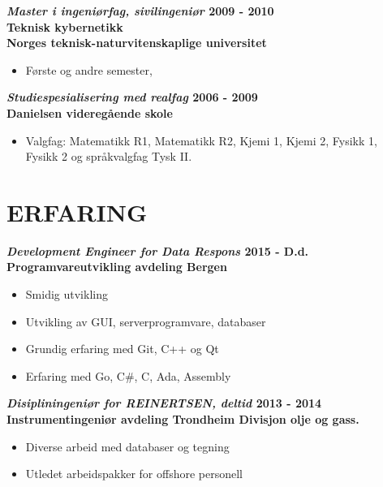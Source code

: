 \documentclass[margin, 10pt, norsk]{res} %
\begin{document}
\begin{resume}
\textbf{\emph{Master i ingeniørfag, sivilingeniør} \hfill 2009 - 2010
\\Teknisk kybernetikk  \\
Norges teknisk-naturvitenskaplige universitet} 
\begin{itemize} \itemsep -2pt %
\item Første og andre semester,
\end{itemize}

\textbf{\emph{Studiespesialisering med realfag }\hfill 2006 - 2009\\
Danielsen videregående skole}
\begin{itemize} \itemsep -2pt %
\item Valgfag: Matematikk R1, Matematikk R2, Kjemi 1, Kjemi 2, Fysikk 1,\\Fysikk 2 og språkvalgfag Tysk II.
\end{itemize}

\hspace{5mm}  

\section{ERFARING}

\textbf{\emph{Development Engineer for Data Respons} \hfill 2015 - D.d.\\
Programvareutvikling avdeling Bergen}

\begin{itemize} \itemsep -2pt %
\item Smidig utvikling
\item Utvikling av GUI, serverprogramvare, databaser
\item Grundig erfaring med Git, C++ og Qt
\item Erfaring med Go, C\#, C, Ada, Assembly
\end{itemize}

\textbf{\emph{Disipliningeniør for REINERTSEN, deltid} \hfill 2013 - 2014\\
Instrumentingeniør avdeling Trondheim
Divisjon olje og gass.}

\begin{itemize} \itemsep -2pt %
\item Diverse arbeid med databaser og tegning
\item Utledet arbeidspakker for offshore personell 
\end{itemize}


\end{resume}
\end{document}
